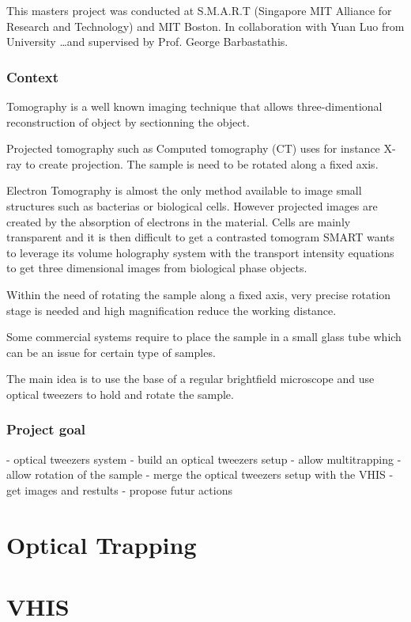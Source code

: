 \documentclass{kepfl}
\begin{document}
This masters project was conducted at S.M.A.R.T (Singapore MIT Alliance for Research and Technology) and MIT Boston. 
In collaboration with Yuan Luo from University \ldots and supervised by Prof. George Barbastathis.

\subsection{Context}
Tomography is a well known imaging technique that allows three-dimentional reconstruction of object by sectionning the object. 

Projected tomography such as Computed tomography (CT) uses for instance X-ray to create projection.
The sample is need to be rotated along a fixed axis. 

Electron Tomography is almost the only method available to image small structures such as bacterias or biological cells. 
However projected images are created by the absorption of electrons in the material. Cells are mainly transparent and it is then difficult to get a contrasted tomogram
SMART wants to leverage its volume holography system with the transport intensity equations to get three dimensional images from biological phase objects. 

Within the need of rotating the sample along a fixed axis, very precise rotation stage is needed and high magnification reduce the working distance. 

Some commercial systems require to place the sample in a small glass tube which can be an issue for certain type of samples. 

The main idea is to use the base of a regular brightfield microscope and use optical tweezers to hold and rotate the sample.

\subsection{Project goal}
- optical tweezers system
- build an optical tweezers setup
- allow multitrapping
- allow rotation of the sample
- merge the optical tweezers setup with the VHIS
- get images and restults
- propose futur actions

\chapter{Optical Trapping}
\chapter{VHIS}
\end{document}
